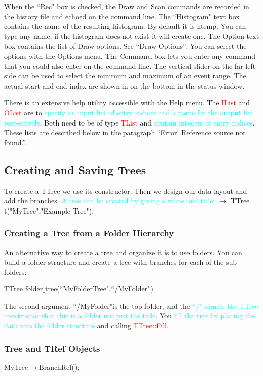 \documentclass[12pt,a4paper]{article}
\begin{document}
When the ``Rec" box is checked, the Draw and Scan commands are recorded in the history file and echoed on the
command line. The ``Histogram" text box contains the name of the resulting histogram. By default it is htemp. You
can type any name, if the histogram does not exist it will create one. The Option text box contains the list of Draw
options. See ``Draw Options”. You can select the options with the Options menu. The Command box lets you enter
any command that you could also enter on the command line. The vertical slider on the far left side can be used to
select the minimum and maximum of an event range. The actual start and end index are shown in on the bottom in
the status window.

There is an extensive help utility accessible with the Help menu. The \textcolor{red}{IList} and \textcolor{red}{OList} are to \textcolor{cyan}{specify an input list of entry indices and a name for the output list respectively}. Both need to be of type \textcolor{red}{TList} and \textcolor{cyan}{contain integers of entry indices}. These lists are described below in the paragraph ``Error! Reference source not found.”.

\subsection{Creating and Saving Trees}
To create a TTree we use its constructor. Then we design our data layout and add the branches. \textcolor{cyan}{A tree can be created by giving a name and title}:
$\rightarrow$
TTree t("MyTree","Example Tree");

\subsubsection{Creating a Tree from a Folder Hierarchy}
An alternative way to create a tree and organize it is to use folders. You can build a folder structure and create a tree with branches for each of the sub-folders:

TTree folder$\_$tree(``MyFolderTree",``/MyFolder")

The second argument ``/MyFolder"is the top folder, and the  \textcolor{cyan}{``/" signals the TTree constructor that this is a folder not just the title}. You  \textcolor{cyan}{fill the tree by placing the data into the folder structure} and calling  \textcolor{red}{TTree::Fill}.

\subsubsection{Tree and TRef Objects}
MyTree$\rightarrow$BranchRef();
\end{document}
